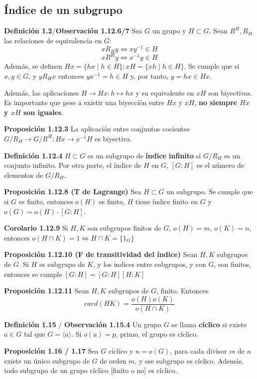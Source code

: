 \documentclass[a4paper, 11pt]{extarticle}
\newcommand{\propo}[1]{\textcolor{rojo}{\textbf{Proposición #1}}}
\newcommand{\defi}[1]{\textcolor{azul}{\textbf{Definición #1}}}
\newcommand{\obs}[1]{\textcolor{verde}{\textbf{Observación #1}}}
\newcommand{\cor}[1]{\textcolor{rosa}{\textbf{Corolario #1}}}
\begin{document}
\subsection{Índice de un subgrupo}
\label{sec:org51d4765}
\defi{1.2}/\obs{1.12.6/7} Sea \(G\) un grupo y \(H \subset G\).  Sean \(R^H, R_H\) las relaciones de equivalencia en \(G\):
\[ xR_H y \iff xy^{-1} \in H \]
\[ xR^H y \iff x^{-1}y \in H \]
Además, se definen \(Hx = \{ hx \;|\; h \in H \}; xH = \{ xh \;|\; h \in H \}\).
Se cumple que si \(x,y \in G\), y \(yR_H x\) entonces \(yx^{-1} = h \in H\) y,
por tanto, \(y = hx \in Hx\).

Además, las aplicaciones \(H \rightarrow Hx: h \mapsto hx\) y su equivalente en \(xH\) son
biyectivas. Es importante que pese a existir una biyeccíón entre
 \(Hx\) y \(xH\), \textbf{no siempre \(Hx\) y \(xH\) son iguales}.

\propo{1.12.3} La aplicación entre conjuntos cocientes
 \(G/R_H \rightarrow G/R^H: Hx \rightarrow x^{-1}H\) es biyectiva.

\defi{1.12.4} \(H \subset G\) es un subgrupo de \textbf{índice infinito} si \(G/R_H\) es
un conjunto infinito. Por otra parte, el índice de \(H\) en \(G\), \([G:H]\) es
 el número de elementos de \(G/R_H\).

\propo{1.12.8 (T de Lagrange)} Sea \(H \subset G\) un subgrupo. Se cumple que 
si \(G\) es finito, entonces \(o(H)\) es
finito, \(H\) tiene índice finito en \(G\) y \(o(G) = o(H) \cdot [G:H]\).

\cor{1.12.9} Si \(H,K\) son subgrupos finitos de \(G\), \(o(H) = m\), \(o(K) = n\), 
entonces \(o(H \cap K) = 1 \iff H \cap K = \{ 1_G \}\)

\propo{1.12.10 (F de transitividad del índice)} Sean \(H,K\) 
subgrupos de \(G\). Si \(H\) es subgrupo de \(K\), y los indices entre subgrupos, y con G,
son finitos, entonces se cumple \([G:H] = [G:H][H:K]\)

\propo{1.12.11} Sean \(H,K\) subgrupos de \(G\), finito. Entonces
\[ card(HK) = \frac{o(H)o(K)}{o(H \cap K)} \]


\defi{1.15} / \obs{1.15.4} Un grupo \(G\) se llama \textbf{cíclico} si existe
 \(a \in G\) tal que \(G
= \langle a \rangle\). Si \(o(a) = p\), primo, el grupo es cíclico.

\propo{1.16 / 1.17} Sea \(G\) cíclico y \(n = o(G)\), para cada divisor \(m\) de
\(n\)
existe un único subgrupo de \(G\) de orden \(m\), y ese subgrupo es cíclico.
Además, todo subgrupo de un grupo cíclico [finito o no] es cíclico.
\end{document}
